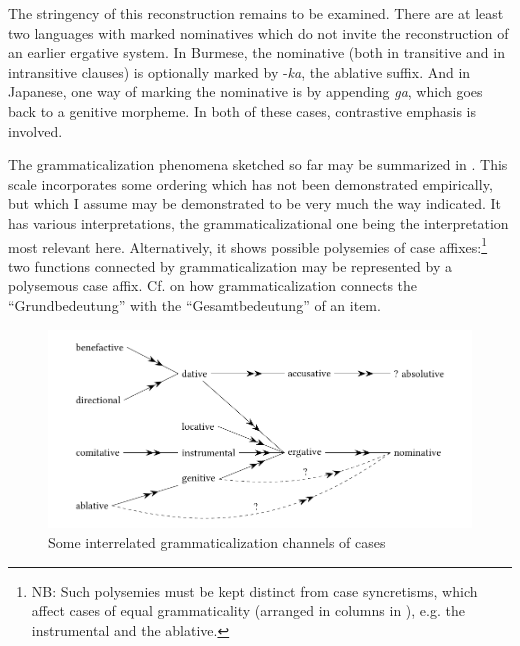 The stringency of this reconstruction remains to be examined. There are at least two languages with marked nominatives which do not invite the reconstruction of an earlier ergative system. In Burmese, the nominative (both in transitive and in intransitive clauses) is optionally marked by -\textit{ka}, the ablative suffix. And in Japanese, one way of marking the nominative is by appending \textit{ga}, which goes back to a genitive morpheme. In both of these cases, contrastive emphasis is involved.

The grammaticalization phenomena sketched so far may be summarized in . This scale incorporates some ordering which has not been demonstrated empirically, but which I assume may be demonstrated to be very much the way indicated. It has various interpretations, the grammaticalizational one being the interpretation most relevant here. Alternatively, it shows possible polysemies of case affixes:\footnote{NB: Such polysemies must be kept distinct from case syncretisms, which affect cases of equal grammaticality (arranged in columns in ), e.g. the instrumental and the ablative.} two functions connected by grammaticalization may be represented by a polysemous case affix. Cf.  on how grammaticalization connects the ``Grundbedeutung'' with the ``Gesamtbedeutung'' of an item.

\begin{figure}
\includegraphics[width=\textwidth]{figures/8-someinterrelated.pdf}
\caption{Some interrelated grammaticalization channels of cases} \label{F8}
\end{figure}

